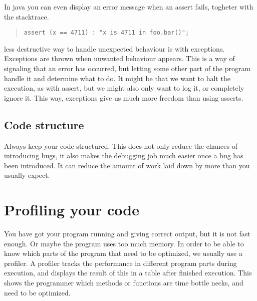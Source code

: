 \documentclass[11pt,a4paper,twoside]{article}
\begin{document}
In java you can even display an error message when an assert fails, togheter
with the stacktrace.

\begin{quote}
\begin{verbatim}
assert (x == 4711) : "x is 4711 in foo.bar()";
\end{verbatim}
\end{quote}

less destructive way to handle unexpected behaviour is with exceptions.
Exceptions are thrown when unwanted behaviour appears. This is a way of
signaling that an error has occurred, but letting some other part of the
program handle it and determine what to do. It might be that we want to halt
the execution, as with assert, but we might also only want to log it, or
completely ignore it. This way, exceptions give us much more freedom than using
asserts.

\subsection{Code structure}
Always keep your code structured. This does not only reduce the chances of
introducing bugs, it also makes the debugging job much easier once a bug has
been introduced. It can reduce the amount of work laid down by more than you
usually expect.


\section{Profiling your code}
You have got your program running and giving correct output, but it is not fast
enough. Or maybe the program uses too much memory. 
In order to be able to know which parts of the program that need to be
optimized, we usually use a profiler.  A profiler tracks the performance in
different program parts during execution, and displays the result of this in a
table after finished execution. This shows the programmer which methods or
functions are time bottle necks, and need to be optimized.
\end{document}
